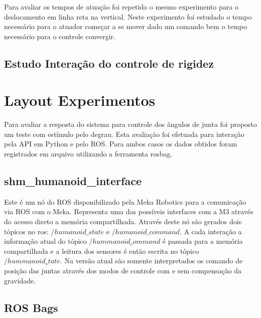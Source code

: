 Para avaliar os tempos de atuação foi repetido o mesmo experimento para o deslocamento em linha reta na vertical. Neste experimento foi estudado o tempo necessário para o atuador começar a se mover dado um comando bem o tempo necessário para o controle convergir.


\subsection{Estudo Interação do controle de rigidez}

\section{Layout Experimentos}

Para avaliar a resposta do sistema para controle dos ângulos de junta foi proposto um teste com estímulo pelo degrau. Esta avaliação foi efetuada para interação pela API em Python e pelo ROS. Para ambos casos os dados obtidos foram registrados em arquivo utilizando a ferramenta rosbag. 





\subsection{shm\_humanoid\_interface}

Este é um nó do ROS disponibilizado pela Meka Robotics para a comunicação via ROS com o Meka. Representa uma das possíveis interfaces com a M3 através do acesso direto a memória compartilhada. Através deste nó são gerados dois tópicos no ros: $/humanoid\_state$ e $/humanoid\_command$. A cada interação a informação atual do tópico $/hummanoid_command$ é passada para a memória compartilhada e a leitura dos sensores é então escrita no tópico $/hummanoid_state$. Na versão atual são somente interpretados os comando de posição das juntas através dos modos de controle com e sem compensação da gravidade.

\subsection{ROS Bags}

